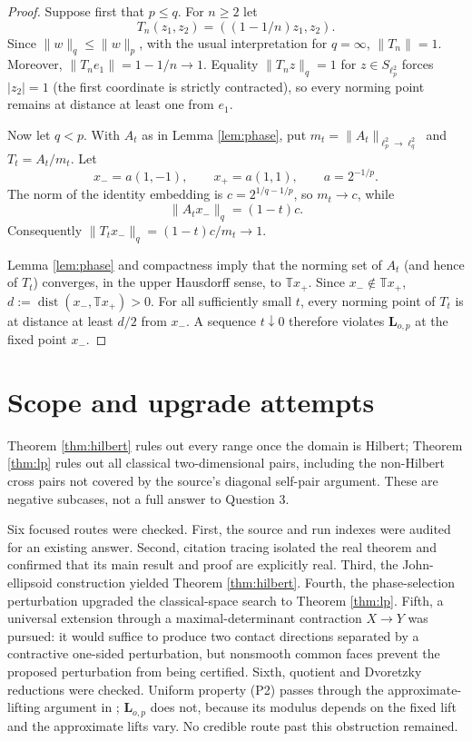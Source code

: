 \documentclass[11pt]{article}
\newcommand{\T}{\mathbb T}
\newcommand{\dist}{\operatorname{dist}}
\begin{document}
\begin{proof}
Suppose first that $p\le q$.  For $n\ge2$ let
\[
 T_n(z_1,z_2)=((1-1/n)z_1,z_2).
\]
Since $\|w\|_q\le\|w\|_p$, with the usual interpretation for $q=\infty$,
$\|T_n\|=1$.  Moreover, $\|T_ne_1\|=1-1/n\to1$.  Equality
$\|T_nz\|_q=1$ for $z\in S_{\ell_p^2}$ forces $|z_2|=1$ (the first
coordinate is strictly contracted), so every norming point remains at
distance at least one from $e_1$.

Now let $q<p$.  With $A_t$ as in Lemma \ref{lem:phase}, put
$m_t=\|A_t\|_{\ell_p^2\to\ell_q^2}$ and $T_t=A_t/m_t$.  Let
\[
 x_-=a(1,-1),\qquad x_+=a(1,1),\qquad a=2^{-1/p}.
\]
The norm of the identity embedding is
$c=2^{1/q-1/p}$, so $m_t\to c$, while
\[
 \|A_tx_-\|_q=(1-t)c.
\]
Consequently $\|T_tx_-\|_q=(1-t)c/m_t\to1$.

Lemma \ref{lem:phase} and compactness imply that the norming set of $A_t$
(and hence of $T_t$) converges, in the upper Hausdorff sense, to
$\T x_+$.  Since $x_-\notin\T x_+$,
$d:=\dist(x_-,\T x_+)>0$.  For all sufficiently small $t$, every norming
point of $T_t$ is at distance at least $d/2$ from $x_-$.  A sequence
$t\downarrow0$ therefore violates $\mathbf L_{o,p}$ at the fixed point
$x_-$.
\end{proof}

\section{Scope and upgrade attempts}

Theorem \ref{thm:hilbert} rules out every range once the domain is Hilbert;
Theorem \ref{thm:lp} rules out all classical two-dimensional pairs, including
the non-Hilbert cross pairs not covered by the source's diagonal
self-pair argument.  These are negative subcases, not a full answer to
Question 3.

Six focused routes were checked.  First, the source and run indexes were
audited for an existing answer.  Second, citation tracing isolated the real
theorem \cite{DKKLM} and confirmed that its main result and proof are
explicitly real.  Third, the John-ellipsoid construction yielded Theorem
\ref{thm:hilbert}.  Fourth, the phase-selection perturbation upgraded the
classical-space search to Theorem \ref{thm:lp}.  Fifth, a universal extension
through a maximal-determinant contraction $X\to Y$ was pursued: it would
suffice to produce two contact directions separated by a contractive
one-sided perturbation, but nonsmooth common faces prevent the proposed
perturbation from being certified.  Sixth, quotient and Dvoretzky reductions
were checked.  Uniform property (P2) passes through the approximate-lifting
argument in \cite{DKKLM}; $\mathbf L_{o,p}$ does not, because its modulus
depends on the fixed lift and the approximate lifts vary.  No credible route
past this obstruction remained.
\end{document}
